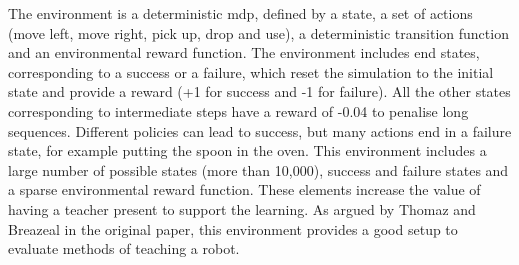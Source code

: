 The environment is a deterministic \gls{mdp}, defined by a state, a set of actions (move left, move right, pick up, drop and use), a deterministic transition function and an environmental reward function. The environment includes end states, corresponding to a success or a failure, which reset the simulation to the initial state and provide a reward (+1 for success and -1 for failure). All the other states corresponding to intermediate steps have a reward of -0.04 to penalise long sequences. Different policies can lead to success, but many actions end in a failure state, for example putting the spoon in the oven. This environment includes a large number of possible states (more than 10,000), success and failure states and a sparse environmental reward function. These elements increase the value of having a teacher present to support the learning. As argued by Thomaz and Breazeal in the original paper, this environment provides a good setup to evaluate methods of teaching a robot.

